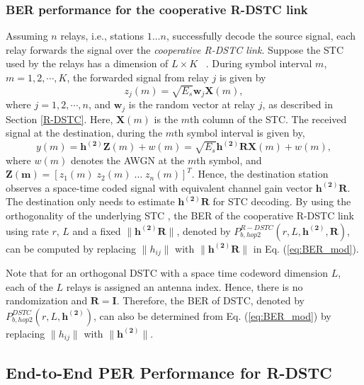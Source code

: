 \documentclass[peerreview,draftcls,onecolumn,12pt,a4paper]{IEEEtran}
\begin{document}
\subsubsection{BER performance for the cooperative R-DSTC link}\label{sec:RDSTCber}
Assuming $n$ relays, i.e., stations $1 \dots n$, successfully
decode the source signal, each relay forwards the signal over the
{\em cooperative R-DSTC link}. Suppose the STC used by the relays
has a dimension of $L \times K$ ~\cite{Jafarkhanistcbook}. During
symbol interval $m$, $m=1,2,\cdots,K$, the forwarded signal from
relay $j$ is given by
\begin{equation}
z_j(m)=\sqrt{E_{s}}\mathbf{w}_j\mathbf{X}(m),
\end{equation}
where $j=1,2, \cdots, n$, and $\mathbf{w}_j$ is the random vector
at relay $j$, as described in Section \ref{R-DSTC}. Here,
$\mathbf{X}(m)$ is the $m$th column of the STC. The received
signal at the destination, during the $m$th symbol interval is
given by,
\begin{equation}
y(m)=\mathbf{h^{(2)}}\mathbf{Z}(m)+w(m)=\sqrt{E_{s}}\mathbf{h^{(2)}}\mathbf{R}\mathbf{X}(m)+w(m),
\label{rdstcreceivedsignal}
\end{equation}
where $w(m)$ denotes the AWGN at the $m$th symbol, and
$\mathbf{Z(m)}=[z_1(m) \; z_2(m) \; \ldots \; z_n(m)]^T$. Hence,
the destination station observes a space-time coded signal with
equivalent channel gain vector $\mathbf{h^{(2)}R}$. The
destination only needs to estimate $\mathbf{h^{(2)}R}$ for STC
decoding. By using the orthogonality of the underlying STC
\cite{Jafarkhanistcbook}, the BER of the cooperative R-DSTC link
using rate $r$, $L$ and a fixed $\|\mathbf{h^{(2)}}\mathbf{R}\|$,
denoted by $P_{b, hop2}^{R-DSTC}(r, L, \mathbf{h^{(2)},R})$, can
be computed by replacing $\|h_{ij}\|$ with $\|\mathbf{h^{(2)}R}\|$
in Eq. (\ref{eq:BER_mod}).

Note that for an orthogonal DSTC with a space time codeword
dimension $L$, each of the $L$ relays is assigned an antenna
index. Hence, there is no randomization and
$\mathbf{R}=\mathbf{I}$. Therefore, the BER of DSTC, denoted by
$P_{b, hop2}^{DSTC}(r, L, \mathbf{h^{(2)}})$, can also be
determined from Eq. (\ref{eq:BER_mod}) by replacing $\|h_{ij}\|$
with $\|\mathbf{h^{(2)}}\|$.

\vspace{-0.15in}
\subsection{End-to-End PER Performance for R-DSTC}\label{sec:perfading}
\vspace{-0.05in}
\end{document}
